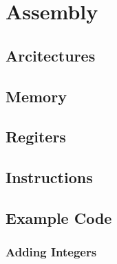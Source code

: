 \section{Assembly}


\subsection{Arcitectures}

\subsection{Memory}

\subsection{Regiters}

\subsection{Instructions}

\subsection{Example Code}
\subsubsection{Adding Integers}


